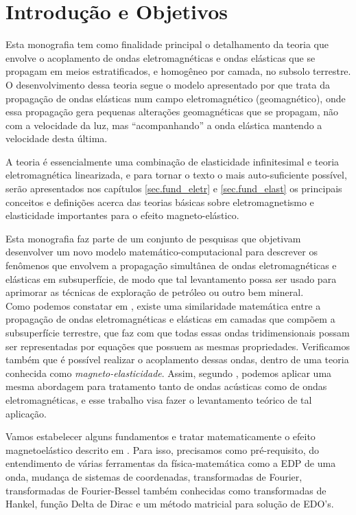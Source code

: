 \chapter{Introdu\c{c}\~ao e Objetivos}
Esta monografia tem como finalidade principal o detalhamento da teoria que envolve o acoplamento de ondas eletromagn\'eticas e ondas el\'asticas que se propagam em meios estratificados, e homog\^eneo por camada, no subsolo terrestre. O desenvolvimento dessa teoria segue o modelo apresentado por \cite{eringen_1963} que trata da propaga\c{c}\~ao de ondas el\'asticas num campo eletromagn\'etico (geomagn\'etico), onde essa propaga\c{c}\~ao gera pequenas altera\c{c}\~oes geomagn\'eticas que se propagam, n\~ao com a velocidade da luz, mas ``acompanhando'' a onda el\'astica mantendo a velocidade desta \'ultima. 

A teoria é essencialmente uma combinação de elasticidade infinitesimal e teoria eletromagnética linearizada, e para tornar o texto o mais auto-suficiente poss\'ivel, serão apresentados nos capítulos \ref{sec.fund_eletr} e \ref{sec.fund_elast} os principais conceitos e definições acerca das teorias básicas sobre eletromagnetismo e elasticidade importantes para o efeito magneto-el\'astico.

Esta monografia faz parte de um conjunto de pesquisas que objetivam desenvolver um novo modelo matemático-computacional para descrever os fenômenos que envolvem a propagação simultânea de ondas eletromagnéticas e elásticas em subsuperfície, de modo que tal levantamento possa ser usado para aprimorar as técnicas de exploração de petróleo ou outro bem mineral.
\\

Como podemos constatar em \cite{eringen_1963}, existe uma similaridade matem\'atica entre a propaga\c{c}\~ao de ondas eletromagn\'eticas e el\'asticas em camadas que comp\~oem a subsuperf\'icie terrestre, que faz com que todas essas ondas tridimensionais possam ser representadas por equa\c{c}\~oes que possuem as mesmas propriedades. Verificamos tamb\'em que \'e poss\'ivel realizar o acoplamento dessas ondas, dentro de uma teoria conhecida como \textit{magneto-elasticidade}. Assim, segundo \cite{Ursin-1983}, podemos aplicar uma mesma abordagem para tratamento tanto de ondas ac\'usticas como de ondas eletromagn\'eticas, e esse trabalho visa fazer o levantamento te\'orico de tal aplica\c{c}\~ao. 

Vamos estabelecer alguns fundamentos e tratar matematicamente o efeito magnetoel\'astico descrito em \cite{pinho_2018}. Para isso, precisamos como pr\'e-requisito, do entendimento de v\'arias ferramentas da f\'isica-matem\'atica como a EDP de uma onda, mudan\c{c}a de sistemas de coordenadas, transformadas de Fourier, transformadas de Fourier-Bessel tamb\'em conhecidas como transformadas de Hankel, fun\c{c}\~ao Delta de Dirac e um m\'etodo matricial para solu\c{c}\~ao de EDO's.

